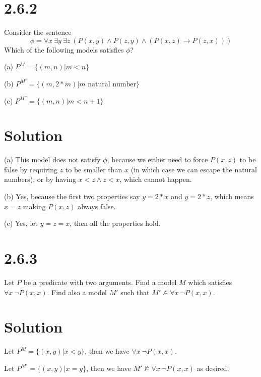 \documentclass[10pt]{article}
\begin{document}
\section*{2.6.2}
Consider the sentence
\[
\phi = \forall x\ \exists y\ \exists z\ (P(x,y)\land P(z,y) \land (P(x,z)\to P(z,x)))
\]
Which of the following models satisfies $\phi$?
\begin{description*}
\item[(a)] $P^M = \{ (m,n) | m < n \}$
\item[(b)] $P^{M'} = \{ (m,2*m) | m \text{ natural number} \}$ 
\item[(c)] $P^{M''} = \{ (m,n) | m < n + 1\}$
\end{description*}
\section*{Solution}
\begin{description*}
\item[(a)] This model does not satisfy $\phi$, because we either need to force $P(x,z)$ to be false by requiring $z$ to be smaller than $x$ (in which case we can escape the natural numbers), or by having $x<z \land z<x$, which cannot happen.
\item[(b)] Yes, because the first two properties say $y=2*x$ and $y=2*z$, which means $x=z$ making $P(x,z)$ always false.
\item[(c)] Yes, let $y=z=x$, then all the properties hold.
\end{description*}
\section*{2.6.3}
Let $P$ be a predicate with two arguments. Find a model $M$ which satisfies $\forall x\ \lnot P(x,x)$. Find also a model $M'$ such that $M'\not \models \forall x\ \lnot P(x,x)$.

\section*{Solution}

\begin{itemize*}
\item Let $P^{M} = \{ (x,y) | x < y\}$, then we have $\forall x\ \lnot P(x,x)$.
\item Let $P^{M'} = \{ (x,y) | x = y\}$, then we have $M'\not \models \forall x\ \lnot P(x,x)$ as desired.
\end{itemize*}
\end{document}
